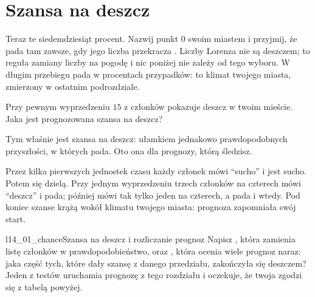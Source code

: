 
\section{Szansa na deszcz}
\label{sec:ch14-rain}

\noindent
Teraz te siedemdziesiąt procent. Nazwij punkt 0 swoim miastem i przyjmij,
że pada tam zawsze, gdy jego liczba przekracza . Liczby
Lorenza nie są deszczem; to reguła zamiany liczby na pogodę i nic poniżej
nie zależy od tego wyboru. W długim przebiegu pada w 
procentach przypadków: to klimat twojego miasta, zmierzony w ostatnim
podrozdziale.

\begin{think}
Przy pewnym wyprzedzeniu $15$ z  członków pokazuje deszcz
w twoim mieście. Jaka jest prognozowana szansa na deszcz?
\end{think}
Tym właśnie jest szansa na deszcz: ułamkiem jednakowo prawdopodobnych
przyszłości, w których pada. Oto ona dla prognozy, którą śledzisz.



\noindent
Przez kilka pierwszych jednostek czasu każdy członek mówi \enquote{sucho} i
jest sucho. Potem się dzielą. Przy jednym wyprzedzeniu trzech członków na
czterech mówi \enquote{deszcz} i pada; później mówi tak tylko jeden na
czterech, a pada i wtedy. Pod koniec szanse krążą wokół klimatu twojego
miasta: prognoza zapomniała swój start.

\begin{lab}{l14_01_chance}{Szansa na deszcz i rozliczanie prognoz}
Napisz , która zamienia listę członków w prawdopodobieństwo,
oraz , która ocenia wiele prognoz naraz: jaka część tych,
które dały szansę z danego przedziału, zakończyła się deszczem? Jeden z
testów uruchamia prognozę z tego rozdziału i oczekuje, że twoja 
zgodzi się z tabelą powyżej.
\end{lab}

